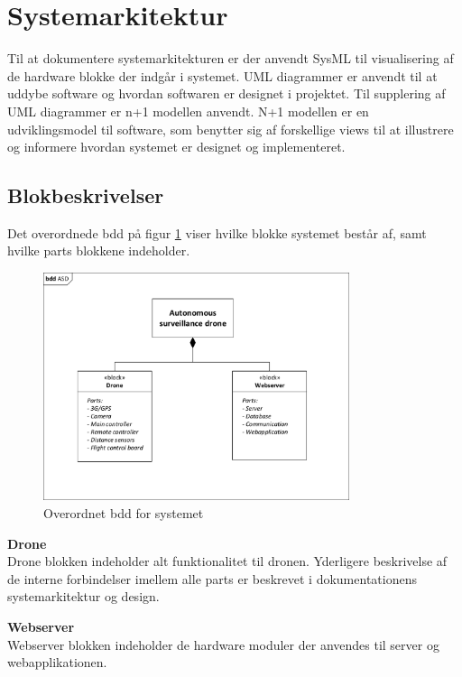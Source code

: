 \section{Systemarkitektur}
\label{chap:systemarkitektur}

Til at dokumentere systemarkitekturen er der anvendt SysML  til visualisering af de hardware blokke der indgår i systemet. UML diagrammer er anvendt til at uddybe software og hvordan softwaren er designet i projektet. Til supplering af UML diagrammer er n+1 modellen anvendt. N+1 modellen er en udviklingsmodel til software, som benytter sig af forskellige views til at illustrere og informere hvordan systemet er designet og implementeret.
 
\subsection{Blokbeskrivelser}
Det overordnede bdd på figur \ref{fig:bdd_asd} viser hvilke blokke systemet består af, samt hvilke parts blokkene indeholder.

\begin{figure}[H]
	\centering
	\includegraphics[width=0.80\textwidth]{Billeder/Projektbeskrivelse/bdd_overordnet.pdf}
	\caption{Overordnet bdd for systemet}
	\label{fig:bdd_asd}
\end{figure}

\textbf{Drone} \\
Drone blokken indeholder alt funktionalitet til dronen. Yderligere beskrivelse af de interne forbindelser imellem alle parts er beskrevet i dokumentationens systemarkitektur og design.

\textbf{Webserver} \\
Webserver blokken indeholder de hardware moduler der anvendes til server og webapplikationen. 


